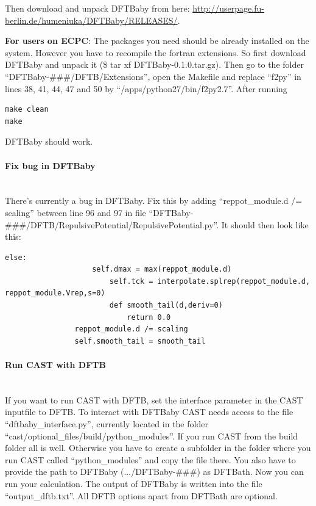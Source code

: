 \documentclass[10pt,a4paper]{article} %
\begin{document}
Then download and unpack DFTBaby from here: \url{http://userpage.fu-berlin.de/humeniuka/DFTBaby/RELEASES/}. 

\textbf{For users on ECPC}: The packages you need should be already installed on the system. However you have to recompile the fortran extensions. So first download DFTBaby and unpack it (\$ tar xf DFTBaby-0.1.0.tar.gz). Then go to the folder ``DFTBaby-\#\#\#/DFTB/Extensions'', open the Makefile and replace ``f2py'' in lines 38, 41, 44, 47 and 50 by ``/apps/python27/bin/f2py2.7''. After running
\begin{lstlisting}
make clean
make
\end{lstlisting}
DFTBaby should work.

\paragraph{Fix bug in DFTBaby}\mbox{}\\

There's currently a bug in DFTBaby. Fix this by adding ``reppot\_module.d /= scaling'' between line 96 and 97 in file ``DFTBaby-\#\#\#/DFTB/RepulsivePotential/RepulsivePotential.py''. It should then look like this:
\begin{lstlisting}[firstnumber=92]
        else:
				    self.dmax = max(reppot_module.d)
						self.tck = interpolate.splrep(reppot_module.d, reppot_module.Vrep,s=0)
						def smooth_tail(d,deriv=0)
						    return 0.0
				reppot_module.d /= scaling
				self.smooth_tail = smooth_tail
\end{lstlisting}

\paragraph{Run CAST with DFTB}\mbox{}\\

If you want to run CAST with DFTB, set the interface parameter in the CAST inputfile to DFTB. To interact with DFTBaby CAST needs access to the file ``dftbaby\_interface.py'', currently located in the folder ``cast/optional\_files/build/python\_modules''. If you run CAST from the build folder all is well. Otherwise you have to create a subfolder in the folder where you run CAST called ``python\_modules'' and copy the file there. You also have to provide the path to DFTBaby (.../DFTBaby-\#\#\#) as DFTBath. Now you can run your calculation. The output of DFTBaby is written into the file ``output\_dftb.txt''. All DFTB options apart from DFTBath are optional. 
\end{document}
